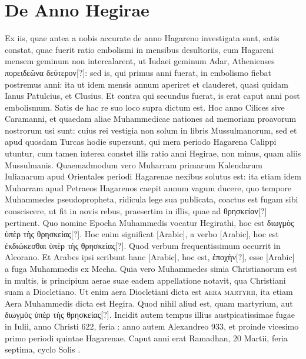 \section{De Anno Hegirae}
%
Ex iis, quae antea a nobis accurate de anno Hagareno investigata
sunt, satis constat, quae fuerit ratio embolismi in mensibus desultoriis,
cum Hagareni mensem geminum non intercalarent, ut
Iudaei geminum Adar, Athenienses \textgreek{πορειδεῶνα δεύτερον[?]}: sed is, qui
primus anni fuerat, in embolismo fiebat postremus anni: ita ut idem
mensis annum aperiret et clauderet, quasi quidam Ianus Patulcius,
et Clusius.
Et contra qui secundus fuerat, is erat caput anni post
embolismum.
Satis de hac re suo loco supra dictum est.
Hoc anno Cilices
sive Caramanni, et quaedam aliae Muhammedicae nationes ad memoriam
proavorum nostrorum usi sunt: cuius rei vestigia non solum
in libris Mussulmanorum, sed et apud quosdam Turcas hodie supersunt,
qui mera periodo Hagarena Calippi utuntur, cum tamen
interea constet illis ratio anni Hegirae, non minus, quam aliis Mussulmanis.
%
Quaemadmodum vero Muharram primarum Kalendarum Iulianarum
apud Orientales periodi Hagarenae nexibus solutus est: ita
etiam idem Muharram apud Petraeos Hagarenos caepit annum vagum
ducere, quo tempore Muhammedes pseudopropheta, ridicula lege
sua publicata, coactus est fugam sibi consciscere, ut fit in novis rebus,
praesertim in illis, quae ad \textgreek{θρησκείαν[?]} pertinent.
Quo nomine Epocha
Muhammedis vocatur Hegirathi, hoc est \textgreek{διωγμὸς ὑπὲρ τὴς θρησκείας[?]}.
Hoc
enim significat \textarabic{}[Arabic], a verbo \textarabic{}[Arabic],
 hoc est \textgreek{ἐκδιώκεσθαι ὑπὲρ τὴς θρησκείας[?]}.
Quod verbum frequentissimum occurrit in Alcorano.
Et Arabes ipsi
scribunt hanc \textarabic{}[Arabic], hoc est, \textgreek{ἐποχὴν[?]},
 esse \textarabic{}[Arabic]
a fuga Muhammedis ex Mecha.
Quia vero Muhammedes simia Christianorum
est in multis, is principium aerae suae eadem appellatione notavit,
qua Christiani suam a Diocletiano.
Ut enim aera Diocletiani
dicta est \textsc{aera martyrii}, ita etiam Aera Muhammedis dicta est Hegira.
Quod nihil aliud est, quam martyrium, aut
 \textgreek{διωγμὸς ὑπὲρ τὴς θρησκείας[?]}.
Incidit autem tempus illius austpicatissimae fugae in  Iulii,
anno Christi 622, feria : anno autem Alexandreo 933, et proinde
vicesimo primo periodi quintae Hagarenae.
Caput anni erat Ramadhan,
20 Martii, feria septima, cyclo Solis .
